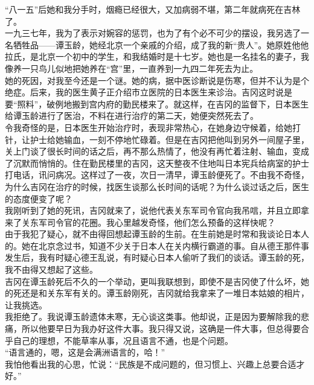 “八一五”后她和我分手时，烟瘾已经很大，又加病弱不堪，第二年就病死在吉林了。\\

一九三七年，我为了表示对婉容的惩罚，也为了有个必不可少的摆设，我另选了一名牺牲品——谭玉龄，她经北京一个亲戚的介绍，成了我的新“贵人”。她原姓他他拉氏，是北京一个初中的学生，和我结婚时是十七岁。她也是一名挂名的妻子，我像养一只鸟儿似地把她养在“宫”里，一直养到一九四二年死去为止。\\

她的死因，对我至今还是一个谜。她的病，据中医诊断说是伤寒，但并不认为是个绝症。后来，我的医生黄子正介绍市立医院的日本医生来诊治。吉冈这时说是要“照料”，破例地搬到宫内府的勤民楼来了。就这样，在吉冈的监督下，日本医生给谭玉龄进行了医治，不料在进行治疗的第二天，她便突然死去了。\\

令我奇怪的是，日本医生开始治疗时，表现非常热心，在她身边守候着，给她打针，让护士给她输血，一刻不停地忙碌着。但是在吉冈把他叫到另外一间屋子里，关上门谈了很长时间的话之后，再不那么热情了，他没有再忙着注射、输血，变成了沉默而悄悄的。住在勤民楼里的吉冈，这天整夜不住地叫日本宪兵给病室的护士打电话，讯问病况。这样过了一夜，次日一清早，谭玉龄便死了。不由我不奇怪，为什么吉冈在治疗的时候，找医生谈那么长时间的话呢？为什么谈过话之后，医生的态度便变了呢？\\

我刚听到了她的死讯，吉冈就来了，说他代表关东军司令官向我吊唁，并且立即拿来了关东军司令官的花圈。我心里越发奇怪，他们怎么预备的这样快呢？\\

由于我犯了疑心，就不由得回想起谭玉龄的生前。在生前她是时常和我谈论日本人的。她在北京念过书，知道不少关于日本人在关内横行霸道的事。自从德王那件事发生后，我有时疑心德王乱说，有时疑心日本人偷听了我们的谈话。谭玉龄的死，我不由得又想起了这些。\\

吉冈在谭玉龄死后不久的一个举动，更叫我联想到，即使不是吉冈使了什么坏，她的死还是和关东军有关的。谭玉龄刚死，吉冈就给我拿来了一堆日本姑娘的相片，让我挑选。\\

我拒绝了。我说谭玉龄遗体未寒，无心谈这类事。他却说，正是因为要解除我的悲痛，所以他要早日为我办好这件大事。我只得又说，这确是一件大事，但总得要合乎自己的理想，不能草率从事，况且语言不通，也是个问题。\\

“语言通的，嗯，这是会满洲语言的，哈！”\\

我怕他看出我的心思，忙说：“民族是不成问题的，但习惯上、兴趣上总要合适才好。”\\

